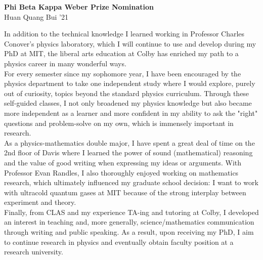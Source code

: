 \documentclass[11pt]{article}
\begin{document}
\begin{center}
	\large{\textbf{Phi Beta Kappa Weber Prize Nomination}}\\
	$\,$\\
	Huan Quang Bui '21
\end{center}


\begin{center}
\end{center}



$\,$\\


In addition to the technical knowledge I learned working in Professor Charles Conover's physics laboratory, which I will continue to use and develop during my PhD at MIT, the liberal arts education at Colby has enriched my path to a physics career in many wonderful ways.\\



For every semester since my sophomore year, I have been encouraged by the physics department to take one independent study where I would explore, purely out of curiosity, topics beyond the standard physics curriculum. Through these self-guided classes, I not only broadened my physics knowledge but also became more independent as a learner and more confident in my ability to ask the "right" questions and problem-solve on my own, which is immensely important in research. \\


As a physics-mathematics double major, I have spent a great deal of time on the 2nd floor of Davis where I learned the power of sound (mathematical) reasoning and the value of good writing when expressing my ideas or arguments. With Professor Evan Randles, I also thoroughly enjoyed working on mathematics research, which ultimately influenced my graduate school decision: I want to work with ultracold quantum gases at MIT because of the strong interplay between experiment and theory. \\




Finally, from CLAS and my experience TA-ing and tutoring at Colby, I developed an interest in teaching and, more generally, science/mathematics communication through writing and public speaking. As a result, upon receiving my PhD, I aim to continue research in physics and eventually obtain faculty position at a research university.
\end{document}
